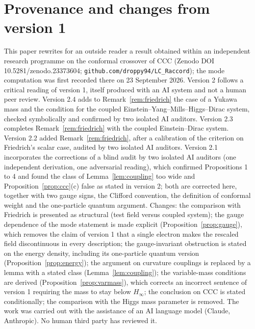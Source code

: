 \documentclass[11pt,a4paper]{article}
\theoremstyle{definition}
\begin{document}
\section*{Provenance and changes from version 1}
This paper rewrites for an outside reader a result obtained within an independent research programme on the conformal crossover of CCC (Zenodo DOI 10.5281/zenodo.23373604; \texttt{github.com/droppy94/LC\_Raccord}); the mode computation was first recorded there on 23 September 2026. Version 2 follows a critical reading of version 1, itself produced with an AI system and not a human peer review. Version 2.4 adds to Remark~\ref{rem:friedrich} the case of a Yukawa mass and the condition for the coupled Einstein--Yang--Mills--Higgs--Dirac system, checked symbolically and confirmed by two isolated AI auditors. Version 2.3 completes Remark~\ref{rem:friedrich} with the coupled Einstein--Dirac system. Version 2.2 added Remark~\ref{rem:friedrich}, after a calibration of the criterion on Friedrich's scalar case, audited by two isolated AI auditors. Version 2.1 incorporates the corrections of a blind audit by two isolated AI auditors (one independent derivation, one adversarial reading), which confirmed Propositions 1 to 4 and found the class of Lemma~\ref{lem:coupling} too wide and Proposition~\ref{prop:ccc}(c) false as stated in version 2; both are corrected here, together with two gauge signs, the Clifford convention, the definition of conformal weight and the one-particle quantum argument. Changes: the comparison with Friedrich is presented as structural (test field versus coupled system); the gauge dependence of the mode statement is made explicit (Proposition~\ref{prop:gauge}), which removes the claim of version 1 that a single electron makes the rescaled field discontinuous in every description; the gauge-invariant obstruction is stated on the energy density, including its one-particle quantum version (Proposition~\ref{prop:energy}); the argument on curvature couplings is replaced by a lemma with a stated class (Lemma~\ref{lem:coupling}); the variable-mass conditions are derived (Proposition~\ref{prop:varmass}), which corrects an incorrect sentence of version 1 requiring the mass to stay below $H_{\infty}$; the conclusion on CCC is stated conditionally; the comparison with the Higgs mass parameter is removed. The work was carried out with the assistance of an AI language model (Claude, Anthropic). No human third party has reviewed it.
\end{document}
